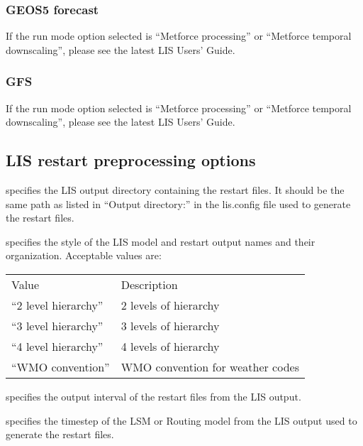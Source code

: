  
 \subsubsection{GEOS5 forecast} 

 If the run mode option selected is ``Metforce processing'' or
 ``Metforce temporal downscaling'', please see the latest LIS Users'
 Guide.

 

 
 \subsubsection{GFS} 

 If the run mode option selected is ``Metforce processing'' or
 ``Metforce temporal downscaling'', please see the latest LIS Users'
 Guide.

 


 
 \subsection{LIS restart preprocessing options} \label{ssec:rstopts}
 

 
  specifies the LIS output
 directory containing the restart files.  It should be the same
 path as listed in ``Output directory:'' in the lis.config file
 used to generate the restart files.

  specifies the style of
 the LIS model and restart output names and their organization.
 Acceptable values are:

 \begin{tabular}{ll}
 Value                 & Description                       \\
 ``2 level hierarchy'' & 2 levels of hierarchy             \\
 ``3 level hierarchy'' & 3 levels of hierarchy             \\
 ``4 level hierarchy'' & 4 levels of hierarchy             \\
 ``WMO convention''    & WMO convention for weather codes  \\
 \end{tabular}

  specifies the output
 interval of the restart files from the LIS output.

  specifies the timestep
 of the LSM or Routing model from the LIS output used to generate
 the restart files.

